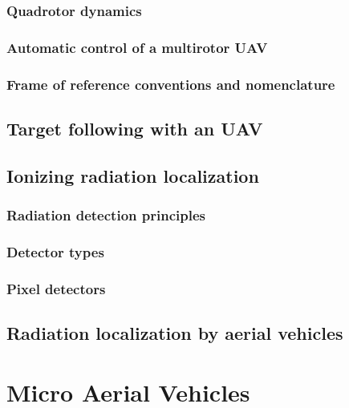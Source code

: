 \documentclass[a4paper,11pt,titlepage,twoside]{book}
\newcommand{\chapternoclear}[1]{
  \begingroup
  \let\cleardoublepage\clearpage
  \chapter{#1}
  \endgroup
}
\begin{document}
\subsection{Quadrotor dynamics}

\subsection{Automatic control of a multirotor UAV}


\subsection{Frame of reference conventions and nomenclature}

\section{Target following with an UAV}

\section{Ionizing radiation localization}

\subsection{Radiation detection principles}

\subsection{Detector types}

\subsection{Pixel detectors}

\section{Radiation localization by aerial vehicles}



\chapternoclear{Micro Aerial Vehicles}
\end{document}
